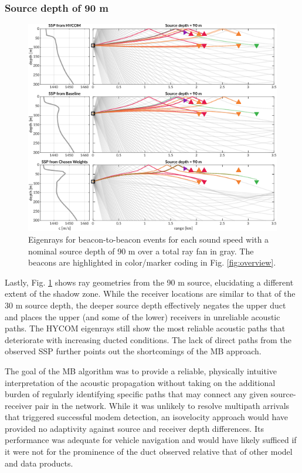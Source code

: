 \subsubsection{Source depth of 90 m}
\begin{figure}[ht!]
  \centering
  \includegraphics[width=\columnwidth]{figs/raytrace-3env-zs-90.pdf}
  \caption{Eigenrays for beacon-to-beacon events for each sound speed with a nominal source depth of 90 m over a total ray fan in gray. The beacons are highlighted in color/marker coding in Fig. \ref{fig:overview}.}
  \label{fig:raytrace-zs90}
\end{figure}

Lastly, Fig. \ref{fig:raytrace-zs90} shows ray geometries from the 90 m source, elucidating a different extent of the shadow zone. 
While the receiver locations are similar to that of the 30 m source depth, the deeper source depth effectively negates the upper duct and places the upper (and some of the lower) receivers in unreliable acoustic paths.
The HYCOM eigenrays still show the most reliable acoustic paths that deteriorate with increasing ducted conditions.
The lack of direct paths from the observed SSP further points out the shortcomings of the MB approach.

The goal of the MB algorithm was to provide a reliable, physically intuitive interpretation of the acoustic propagation without taking on the additional burden of regularly identifying specific paths that may connect any given source-receiver pair in the network.
While it was unlikely to resolve multipath arrivals that triggered successful modem detection, an isovelocity approach would have provided no adaptivity against source and receiver depth differences.
Its performance was adequate for vehicle navigation and would have likely sufficed if it were not for the prominence of the duct observed relative that of other model and data products.

